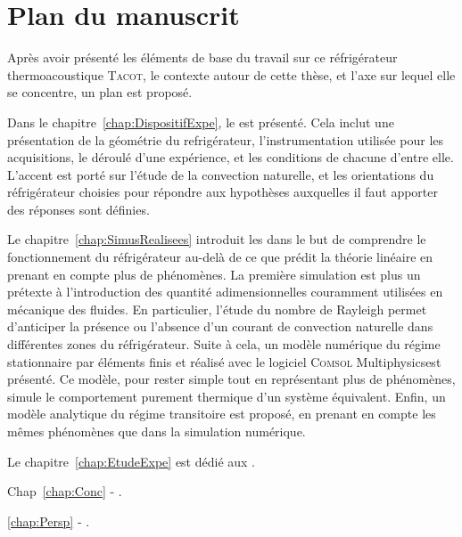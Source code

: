 \section{Plan du manuscrit}
Après avoir présenté les éléments de base du travail sur ce réfrigérateur thermoacoustique \textsc{Tacot}, le contexte autour de cette thèse, et l'axe sur lequel elle se concentre, un plan est proposé.\medskip

Dans le chapitre~\ref{chap:DispositifExpe}, le   est présenté. Cela inclut une présentation de la géométrie du refrigérateur, l'instrumentation utilisée pour les acquisitions, le déroulé d'une expérience, et les conditions de chacune d'entre elle. L'accent est porté sur l'étude de la convection naturelle, et les orientations du réfrigérateur choisies pour répondre aux hypothèses auxquelles il faut apporter des réponses sont définies.\smallskip

Le chapitre~\ref{chap:SimusRealisees} introduit les  dans le but de comprendre le fonctionnement du réfrigérateur au-delà de ce que prédit la théorie linéaire en prenant en compte plus de phénomènes. La première simulation est  plus un prétexte à l'introduction des quantité adimensionnelles couramment utilisées en mécanique des fluides. En particulier, l'étude du nombre de Rayleigh permet d'anticiper la présence ou l'absence d'un courant de convection naturelle dans différentes zones du réfrigérateur. Suite à cela, un modèle numérique du régime stationnaire par éléments finis et réalisé avec le logiciel \textsc{Comsol} Multiphysics\textss\textregistered est présenté. Ce modèle, pour rester simple tout en représentant plus de phénomènes, simule le comportement purement thermique d'un système équivalent. Enfin, un modèle analytique du régime transitoire est proposé, en prenant en compte les mêmes phénomènes que dans la simulation numérique.\smallskip

Le chapitre~\ref{chap:EtudeExpe} est dédié aux . \smallskip

Chap~\ref{chap:Conc} - .\smallskip

\ref{chap:Persp} - .


